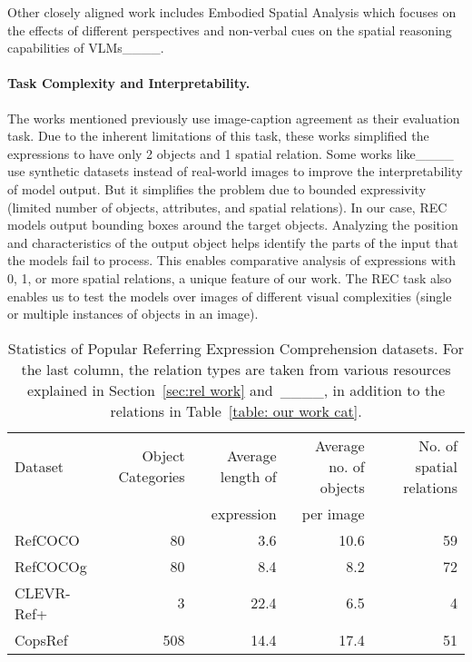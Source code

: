 Other closely aligned work includes Embodied Spatial Analysis which focuses on the effects of different perspectives and non-verbal cues on the spatial reasoning capabilities of VLMs____.
\noindent \paragraph{Task Complexity and Interpretability.} The works mentioned previously use image-caption agreement as their evaluation task. Due to the inherent limitations of this task, these works simplified the expressions to have only 2 objects and 1 spatial relation. Some works like____ use synthetic datasets instead of real-world images to improve the interpretability of model output. But it simplifies the problem due to bounded expressivity (limited number of objects, attributes, and spatial relations). In our case, REC models output bounding boxes around the target objects. Analyzing the position and characteristics of the output object helps identify the parts of the input that the models fail to process. This enables comparative analysis of expressions with 0, 1, or more spatial relations, a unique feature of our work. The REC task also enables us to test the models over images of different visual complexities (single or multiple instances of objects in an image).
\begin{table*}[!ht]
\centering
\begin{tabular}{lrrrr}
\toprule
Dataset & Object Categories & Average length of & Average no. of objects & No. of spatial relations\\
 & & expression & per image & \\
\midrule
RefCOCO & 80 & 3.6 & 10.6 & 59 \\
RefCOCOg & 80 & 8.4 & 8.2 & 72 \\
CLEVR-Ref+ & 3 & 22.4 & 6.5 & 4 \\
CopsRef & 508 & 14.4 & 17.4 & 51 \\
\bottomrule
\end{tabular}
\caption{Statistics of Popular Referring Expression Comprehension datasets. For the last column, the relation types are taken from various resources explained in Section~\protect\ref{sec:rel work} and~\protect____, in addition to the relations in Table~\protect\ref{table: our work cat}.}
\label{table: data-stats}
\end{table*}
